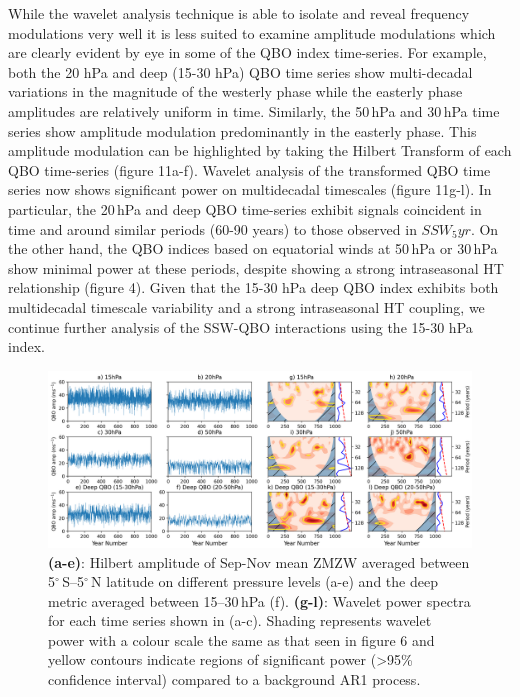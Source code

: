 
While the wavelet analysis technique is able to isolate and reveal frequency modulations very well it is less suited to examine amplitude modulations which are clearly evident by eye in some of the QBO index time-series. For example, both the 20 hPa and deep (15-30 hPa) QBO time series show multi-decadal variations in the magnitude of the westerly phase while the easterly phase amplitudes are relatively uniform in time. Similarly, the 50\,hPa and 30\,hPa time series show amplitude modulation predominantly in the easterly phase. This amplitude modulation can be highlighted by taking the Hilbert Transform of each QBO time-series (figure 11a-f). Wavelet analysis of the transformed QBO time series now shows significant power on multidecadal timescales (figure 11g-l). In particular, the 20\,hPa and deep QBO time-series exhibit signals coincident in time and around similar periods (60-90 years) to those observed in $SSW_5yr$. On the other hand, the QBO indices based on equatorial winds at 50\,hPa or 30\,hPa show minimal power at these periods, despite showing a strong intraseasonal HT relationship (figure 4). Given that the 15-30 hPa deep QBO  index exhibits  both multidecadal timescale variability and a strong intraseasonal HT coupling, we continue further analysis of the SSW-QBO interactions using the 15-30 hPa index. 


\begin{center}
\begin{figure}[h!]
\includegraphics[width = \linewidth]{Figures/Figures-origins/QBO_levels_amp.png}
\caption{\textbf{(a-e)}: Hilbert amplitude of Sep-Nov mean ZMZW averaged between 5$^\circ$\,S--5$^\circ$\,N latitude on different pressure levels (a-e) and the deep metric averaged between 15--30\,hPa (f). \textbf{(g-l)}: Wavelet power spectra for each time series shown in (a-c). Shading represents wavelet power with a colour scale the same as that seen in figure 6 and yellow contours indicate regions of significant power (>95\% confidence interval) compared to a background AR1 process.}
\label{QBO_levs_amp}
\end{figure}
\end{center}

